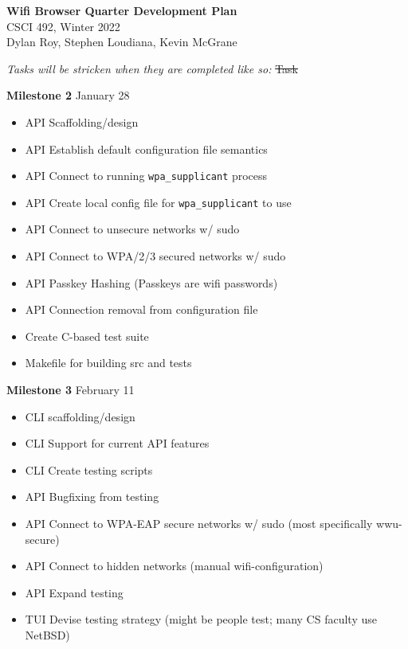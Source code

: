 \documentclass[11pt]{article}
\begin{document}
\begin{center}
  \textbf{\Large Wifi Browser Quarter Development Plan}\\\large CSCI 492, Winter 2022\\
  Dylan Roy, Stephen Loudiana, Kevin McGrane
\end{center}


\textit{Tasks will be stricken when they are completed like so:} \sout{Task}

\textbf{Milestone 2} January 28
\begin{itemize}
  \item API Scaffolding/design
  \item API Establish default configuration file semantics
  \item API Connect to running \texttt{wpa\_supplicant} process
  \item API Create local config file for \texttt{wpa\_supplicant} to use
  \item API Connect to unsecure networks w/ sudo
  \item API Connect to WPA/2/3 secured networks w/ sudo
  \item API Passkey Hashing (Passkeys are wifi passwords)
  \item API Connection removal from configuration file
  \item Create C-based test suite
  \item Makefile for building src and tests
\end{itemize}

\textbf{Milestone 3} February 11
\begin{itemize}
  \item CLI scaffolding/design
  \item CLI Support for current API features
  \item CLI Create testing scripts
  \item API Bugfixing from testing
  \item API Connect to WPA-EAP secure networks w/ sudo (most specifically wwu-secure)
  \item API Connect to hidden networks (manual wifi-configuration)
  \item API Expand testing
  \item TUI Devise testing strategy (might be people test; many CS faculty use NetBSD)
\end{itemize}
\end{document}
